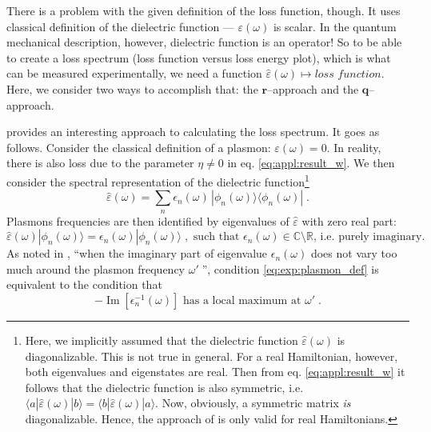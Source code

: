 \documentclass[a4paper,12pt]{article}
\begin{document}
    There is a problem with the given definition of the loss function, though. It uses classical definition of the dielectric function --- $\varepsilon(\omega)$ is scalar. In the quantum mechanical description, however, dielectric function is an operator! So to be able to create a loss spectrum (loss function versus loss energy plot), which is what can be measured experimentally, we need a function $\hat\varepsilon(\omega) \mapsto \textit{loss function}$. Here, we consider two ways to accomplish that: the $\mathbf{r}$--approach and the $\mathbf{q}$--approach.

    \cite{plasmonic2015} provides an interesting approach to calculating the loss spectrum. It goes as follows. Consider the classical definition of a plasmon: $\varepsilon(\omega) = 0$. In reality, there is also loss due to the parameter $\eta \neq 0$ in eq. \eqref{eq:appl:result_w}. We then consider the spectral representation of the dielectric function\footnote{ %
    Here, we implicitly assumed that the dielectric function $\hat\varepsilon(\omega)$ is diagonalizable. This is not true in general. For a real Hamiltonian, however, both eigenvalues and eigenstates are real. Then from eq. \eqref{eq:appl:result_w} it follows that the dielectric function is also symmetric, i.e. $\langle a|\hat\varepsilon(\omega)|b \rangle = \langle b|\hat\varepsilon(\omega)|a \rangle$. Now, obviously, a symmetric matrix \textit{is} diagonalizable. Hence, the approach of \cite{plasmonic2015} is only valid for real Hamiltonians.}
    \begin{equation*}
        \hat\varepsilon(\omega) = \sum_n \epsilon_n(\omega) \, |\phi_n(\omega)\rangle\!\langle \phi_n(\omega)|\; .
    \end{equation*}
    Plasmons frequencies are then identified by eigenvalues of $\hat\varepsilon$ with zero real part:
    \begin{equation} \label{eq:exp:plasmon_def}
        \hat\varepsilon(\omega)|\phi_n(\omega)\rangle = \epsilon_n(\omega) |\phi_n(\omega)\rangle\;,\text{ such that }\epsilon_n(\omega) \in \mathbb{C}\setminus\mathbb{R}\text{, i.e. purely imaginary.}
    \end{equation}
    As noted in \cite{andersen2012spatially}, ``when the imaginary part of eigenvalue $\epsilon_n(\omega)$ does not vary too much around the plasmon frequency $\omega'\;$'', condition \eqref{eq:exp:plasmon_def} is equivalent to the condition that
    \begin{equation} \label{eq:exp:plasmon_qm_condition}
        -\operatorname{Im}[\epsilon_n^{-1}(\omega)] \text{ has a local maximum at }\omega'\;.
    \end{equation}
\end{document}
